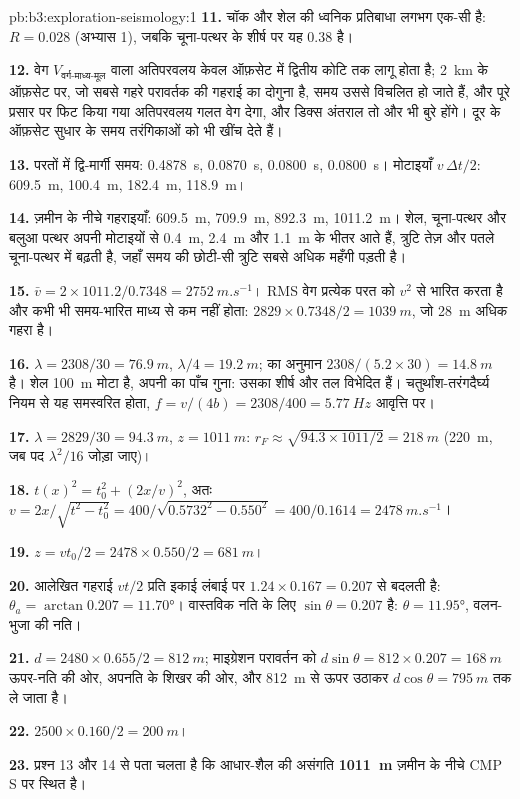 \begin{solution}{pb:b3:exploration-seismology:1}
\textbf{11.} चॉक और शेल की ध्वनिक प्रतिबाधा लगभग एक-सी है: $R = 0.028$
(अभ्यास 1), जबकि चूना-पत्थर के शीर्ष पर यह 0.38 है।

\textbf{12.} वेग $V_{\text{वर्ग-माध्य-मूल}}$ वाला अतिपरवलय केवल ऑफ़सेट में द्वितीय कोटि तक
लागू होता है; \qty{2}{km} के ऑफ़सेट पर, जो सबसे गहरे परावर्तक की गहराई का
दोगुना है, समय उससे विचलित हो जाते हैं, और पूरे प्रसार पर फिट किया गया
अतिपरवलय गलत वेग देगा, और डिक्स अंतराल तो और भी बुरे होंगे। दूर के ऑफ़सेट
सुधार के समय तरंगिकाओं को भी खींच देते हैं।

\textbf{13.} परतों में द्वि-मार्गी समय: \qty{0.4878}{s}, \qty{0.0870}{s},
\qty{0.0800}{s}, \qty{0.0800}{s}। मोटाइयाँ $v\,\Delta t/2$: \qty{609.5}{m},
\qty{100.4}{m}, \qty{182.4}{m}, \qty{118.9}{m}।

\textbf{14.} ज़मीन के नीचे गहराइयाँ: \qty{609.5}{m}, \qty{709.9}{m},
\qty{892.3}{m}, \qty{1011.2}{m}। शेल, चूना-पत्थर और बलुआ पत्थर
अपनी मोटाइयों से \qty{0.4}{m}, \qty{2.4}{m} और \qty{1.1}{m} के भीतर आते हैं, त्रुटि
तेज़ और पतले चूना-पत्थर में बढ़ती है, जहाँ समय की छोटी-सी त्रुटि
सबसे अधिक महँगी पड़ती है।

\textbf{15.} $\bar v = 2\times1011.2/0.7348 = \qty{2752}{m.s^{-1}}$। RMS
वेग प्रत्येक परत को $v^2$ से भारित करता है और कभी भी समय-भारित
माध्य से कम नहीं होता: $2829\times0.7348/2 = \qty{1039}{m}$, जो \qty{28}{m} अधिक गहरा है।

\textbf{16.} $\lambda = 2308/30 = \qty{76.9}{m}$, $\lambda/4 = \qty{19.2}{m}$;
 का अनुमान $2308/(5.2\times30) = \qty{14.8}{m}$ है। शेल
\qty{100}{m} मोटा है, अपनी  का पाँच गुना: उसका शीर्ष और तल
विभेदित हैं। चतुर्थांश-तरंगदैर्घ्य नियम से यह समस्वरित होता, $f = v/(4b) =
2308/400 = \qty{5.77}{Hz}$ आवृत्ति पर।

\textbf{17.} $\lambda = 2829/30 = \qty{94.3}{m}$, $z = \qty{1011}{m}$:
$r_F \approx \sqrt{94.3\times1011/2} = \qty{218}{m}$ (\qty{220}{m}, जब
पद $\lambda^2/16$ जोड़ा जाए)।

\textbf{18.} $t(x)^2 = t_0^2 + (2x/v)^2$, अतः $v = 2x/\sqrt{t^2 - t_0^2} =
400/\sqrt{0.5732^2 - 0.550^2} = 400/0.1614 = \qty{2478}{m.s^{-1}}$।

\textbf{19.} $z = vt_0/2 = 2478\times0.550/2 = \qty{681}{m}$।

\textbf{20.} आलेखित गहराई $vt/2$ प्रति इकाई लंबाई पर $1.24\times0.167 = 0.207$ से
बदलती है: $\theta_a = \arctan0.207 = \ang{11.70}$। वास्तविक नति के लिए
$\sin\theta = 0.207$ है: $\theta = \ang{11.95}$, वलन-भुजा की नति।

\textbf{21.} $d = 2480\times0.655/2 = \qty{812}{m}$; माइग्रेशन परावर्तन को
$d\sin\theta = 812\times0.207 = \qty{168}{m}$ ऊपर-नति की ओर, अपनति के
शिखर की ओर, और \qty{812}{m} से ऊपर उठाकर $d\cos\theta =
\qty{795}{m}$ तक ले जाता है।

\textbf{22.} $2500\times0.160/2 = \qty{200}{m}$।

\textbf{23.} प्रश्न 13 और 14 से पता चलता है कि आधार-शैल की असंगति
\textbf{\qty[text-series-to-math=true]{1011}{m}} ज़मीन के नीचे CMP S पर स्थित है।
\end{solution}
